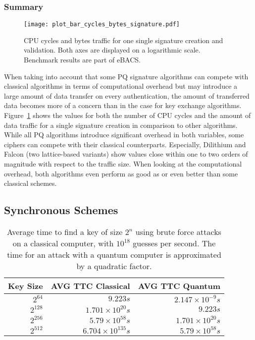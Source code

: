 \subsubsection{Summary}

\begin{figure}[ht]
    \centering\texttt{[image: plot\_bar\_cycles\_bytes\_signature.pdf]}
    \caption{\acs{CPU} cycles and bytes traffic for one single signature creation and validation. Both axes are displayed on a logarithmic scale. Benchmark results are part of eBACS\cite{eBACS}.}\label{fig:pq_sig_c_b}
\end{figure}

When taking into account that some \ac{PQ} signature algorithms can compete with classical algorithms in terms of computational overhead but may introduce a large amount of data transfer on every authentication, the amount of transferred data becomes more of a concern than in the case for key exchange algorithms. Figure~\ref{fig:pq_sig_c_b} shows the values for both the number of \acs{CPU} cycles and the amount of data traffic for a single signature creation in comparison to other algorithms. While all \ac{PQ} algorithms introduce significant overhead in both variables, some ciphers can compete with their classical counterparts. Especially, Dilithium and Falcon (two lattice-based variants) show values close within one to two orders of magnitude with respect to the traffic size. When looking at the computational overhead, both algorithms even perform as good as or even better than some classical schemes.

\subsection{Synchronous Schemes}

\begin{table}[t]
    \centering
    \caption{Average time to find a key of size \(2^n\) using brute force attacks on a classical computer, with \(10^{18}\) guesses per second. The time for an attack with a quantum computer is approximated by a quadratic factor.}
        \begin{tabular}{ rr r }
        \hline
         \textbf{Key Size} & \textbf{AVG TTC Classical} & \textbf{AVG TTC Quantum} \\ 
         \hline
         \(2^{64}\)  & \(9.223 s\) & \(2.147 \times 10^{-9} s\) \\  
         \hline
         \(2^{128}\) & \(1.701 \times 10^{20} s \)& \(9.223 s\) \\  
         \hline
         \(2^{256}\) & \(5.79 \times 10^{58} s \) &  \(1.701 \times 10^{20} s \) \\  
         \hline
         \(2^{512}\) & \(6.704 \times 10^{135} s \) & \(5.79 \times 10^{58} s \) \\
        \end{tabular}
        \label{table:brute_force_sync}
\end{table}
    
